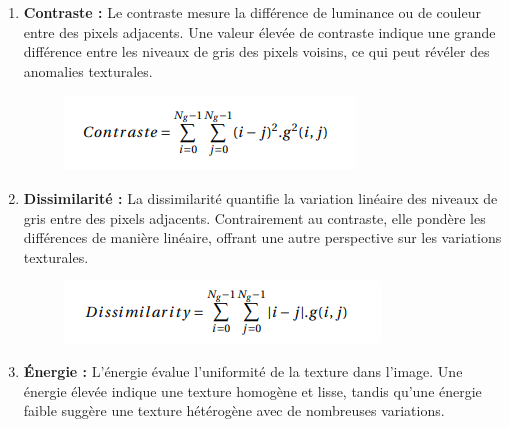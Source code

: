 \documentclass{article}
\begin{document}
	\begin{enumerate}
		\item \textbf{Contraste :}
		Le contraste mesure la différence de luminance ou de couleur entre des pixels adjacents. Une valeur élevée de contraste indique une grande différence entre les niveaux de gris des pixels voisins, ce qui peut révéler des anomalies texturales.
		
		\begin{figure}[htbp]
			\begin{center}
				\begin{minipage}[b]{0.5\textwidth}
					\centering
					\includegraphics[width=\textwidth]{img/constrate.png}
				\end{minipage}
			\end{center}
		\end{figure}
		
		\item \textbf{Dissimilarité :}
		La dissimilarité quantifie la variation linéaire des niveaux de gris entre des pixels adjacents. Contrairement au contraste, elle pondère les différences de manière linéaire, offrant une autre perspective sur les variations texturales.
		
		\begin{figure}[htbp]
			\begin{center}
				\begin{minipage}[b]{0.5\textwidth}
					\centering
					\includegraphics[width=\textwidth]{img/dissimilarity.png}
				\end{minipage}
			\end{center}
		\end{figure}
		
		\item \textbf{Énergie :}
		L'énergie évalue l'uniformité de la texture dans l'image. Une énergie élevée indique une texture homogène et lisse, tandis qu'une énergie faible suggère une texture hétérogène avec de nombreuses variations.
		

\end{enumerate}
\end{document}
